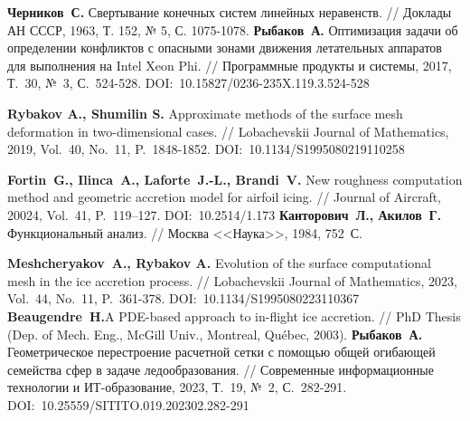 \newpage

\renewcommand{\baselinestretch}{1.0}
\begin{thebibliography}{99}








% 
\textbf{Черников~С.} Свертывание конечных систем линейных неравенств. // Доклады АН СССР, 1963, Т. 152, № 5, С. 1075-1078.
%
\textbf{Рыбаков~А.} Оптимизация задачи об определении конфликтов с опасными зонами движения летательных аппаратов для выполнения на Intel Xeon Phi. // Программные продукты и системы, 2017, Т.~30, №~3, С.~524-528.
DOI:~10.15827/0236-235X.119.3.524-528
%



%
\textbf{Rybakov A., Shumilin S.} Approximate methods of the surface mesh deformation in two-dimensional cases. // Lobachevskii Journal of Mathematics, 2019, Vol.~40, No.~11, P.~1848-1852. DOI:~10.1134/S1995080219110258

\textbf{Fortin~G., Ilinca~A., Laforte~J.-L., Brandi~V.} New roughness computation method and geometric accretion model for airfoil icing. // Journal of Aircraft, 20024, Vol.~41, P.~119–127. DOI:~10.2514/1.173
%
\textbf{Канторович~Л., Акилов~Г.} Функциональный анализ. // Москва <<Наука>>, 1984, 752~С.
%



%
\textbf{Meshcheryakov~A., Rybakov A.} Evolution of the surface computational mesh in the ice accretion process. // Lobachevskii Journal of Mathematics, 2023, Vol.~44, No.~11, P.~361-378. DOI:~10.1134/S1995080223110367
%
\textbf{Beaugendre~H.}A PDE-based approach to in-flight ice accretion. // PhD Thesis (Dep. of Mech. Eng., McGill Univ., Montreal, Qu{\'e}bec, 2003).
%
\textbf{Рыбаков~А.} Геометрическое перестроение расчетной сетки с помощью общей огибающей семейства сфер в задаче ледообразования. // Современные информационные технологии и ИТ-образование, 2023, Т.~19, №~2, С.~282-291. DOI:~10.25559/SITITO.019.202302.282-291
%




\end{thebibliography}
